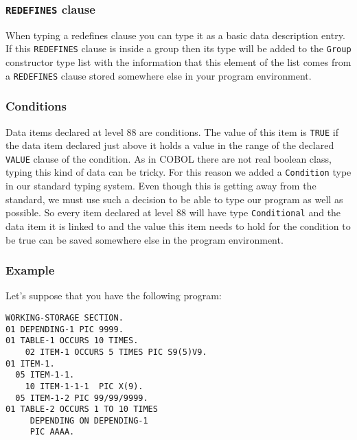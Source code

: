 \documentclass[a4paper,10pt]{article}
\newcommand{\ocamli}[1]{\texttt{#1}}
\newcommand{\coboli}[1]{\texttt{#1}}
\begin{document}
\subsubsection{\coboli{REDEFINES} clause}
When typing a redefines clause you can type it as a basic data description entry. If this \coboli{REDEFINES} clause
is inside a group then its type will be added to the \ocamli{Group} constructor type list with the
information that this element of the list comes from a \coboli{REDEFINES} clause stored somewhere
else in your program environment.

\subsubsection{Conditions}
Data items declared at level $88$ are conditions. The value of this item is \coboli{TRUE} if the
data item declared just above it holds a value in the range of the declared \coboli{VALUE} clause
of the condition. As in COBOL there are not real boolean class, typing this kind of data can be tricky.
For this reason we added a \ocamli{Condition} type in our standard typing system. Even though this
is getting away from the standard, we must use such a decision to be able to type our program as
well as possible.
So every item declared at level $88$ will have type \ocamli{Conditional} and the data item it is linked
to and the value this item needs to hold for the condition to be true can be saved somewhere else in
the program environment.

\subsubsection{Example}
Let's suppose that you have the following program: 
\begin{verbatim}
WORKING-STORAGE SECTION.
01 DEPENDING-1 PIC 9999.
01 TABLE-1 OCCURS 10 TIMES.
    02 ITEM-1 OCCURS 5 TIMES PIC S9(5)V9.
01 ITEM-1.
  05 ITEM-1-1.
    10 ITEM-1-1-1  PIC X(9).
  05 ITEM-1-2 PIC 99/99/9999.
01 TABLE-2 OCCURS 1 TO 10 TIMES
     DEPENDING ON DEPENDING-1
     PIC AAAA.
\end{verbatim}
\end{document}
